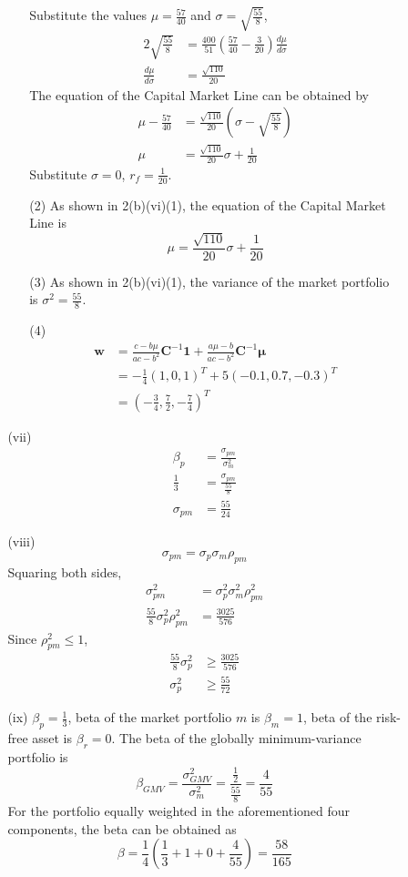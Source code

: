 \documentclass{article}
\begin{document}
\begin{enumerate}
\begin{itemize}
\begin{itemize}
\begin{itemize}
Substitute the values $\mu=\frac{57}{40}$ and $\sigma=\sqrt{\frac{55}{8}}$,
\begin{align*}
2\sqrt{\frac{55}{8}}&=\frac{400}{51}\left(\frac{57}{40}-\frac{3}{20}\right)\frac{d\mu}{d\sigma} \\
\frac{d\mu}{d\sigma}&=\frac{\sqrt{110}}{20}
\end{align*}
The equation of the Capital Market Line can be obtained by
\begin{align*}
\mu-\frac{57}{40}&=\frac{\sqrt{110}}{20}\left(\sigma-\sqrt{\frac{55}{8}}\right) \\
\mu&=\frac{\sqrt{110}}{20}\sigma+\frac{1}{20}
\end{align*}
Substitute $\sigma=0$, $r_f=\frac{1}{20}$.\
\item[(2)]
As shown in 2(b)(vi)(1), the equation of the Capital Market Line is
\[\mu=\frac{\sqrt{110}}{20}\sigma+\frac{1}{20}\]
\item[(3)]
As shown in 2(b)(vi)(1), the variance of the market portfolio is $\sigma^2=\frac{55}{8}$.
\item[(4)]
\begin{align*}
\mathbf{w}&=\frac{c-b\mu}{ac-b^2}\mathbf{C}^{-1}\mathbf{1}+\frac{a\mu-b}{ac-b^2}\mathbf{C}^{-1}\boldsymbol\mu \\
&=-\frac{1}{4}(1,0,1)^T+5(-0.1,0.7,-0.3)^T \\
&=\left(-\frac{3}{4},\frac{7}{2},-\frac{7}{4}\right)^T
\end{align*}
\end{itemize}

\item[(vii)]
\begin{align*}
\beta_p&=\frac{\sigma_{pm}}{\sigma_m^2} \\
\frac{1}{3}&=\frac{\sigma_{pm}}{\frac{55}{8}} \\
\sigma_{pm}&=\frac{55}{24}
\end{align*}

\item[(viii)]
\[\sigma_{pm}=\sigma_p\sigma_m\rho_{pm}\]
Squaring both sides,
\begin{align*}
\sigma_{pm}^2&=\sigma_p^2\sigma_m^2\rho_{pm}^2 \\
\frac{55}{8}\sigma_p^2\rho_{pm}^2&=\frac{3025}{576}
\end{align*}
Since $\rho_{pm}^2\leq 1$, 
\begin{align*}
\frac{55}{8}\sigma_p^2&\geq\frac{3025}{576} \\
\sigma_p^2&\geq\frac{55}{72}
\end{align*}
\item[(ix)]
$\beta_p=\frac{1}{3}$, beta of the market portfolio $m$ is $\beta_m=1$, beta of the risk-free asset is $\beta_r=0$.
The beta of the globally minimum-variance portfolio is
\[\beta_{GMV}=\frac{\sigma_{GMV}^2}{\sigma_m^2}=\frac{\frac{1}{2}}{\frac{55}{8}}=\frac{4}{55}\]
For the portfolio equally weighted in the aforementioned four components, the beta can be obtained as
\[\beta=\frac{1}{4}\left(\frac{1}{3}+1+0+\frac{4}{55}\right)=\frac{58}{165}\]
\end{itemize}
\end{itemize}
\end{enumerate}
\end{document}
